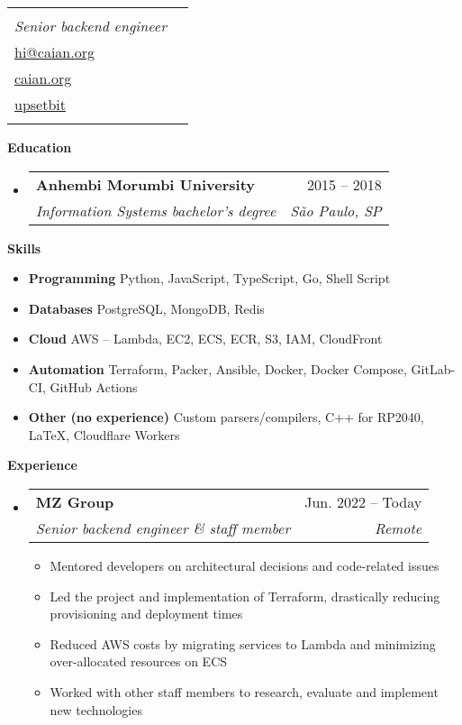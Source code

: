 \documentclass[letterpaper,12pt]{article}[leftmargin=*]
\makeatletter
\def \fullname {Caian Ertl}
\def \subtitle {Senior backend engineer}
\def \emailicon {\faEnvelope}
\def \emaillink {mailto:hi@caian.org}
\def \emailtext {hi@caian.org}
\def \phoneicon {\faPhone}
\def \phonetext {+1 (212) 555-4240}
\def \githubicon {\faGithub}
\def \githublink {https://github.com/upsetbit}
\def \githubtext {upsetbit}
\def \websiteicon {\faGlobe}
\def \websitelink {https://caian.org}
\def \websitetext {caian.org}
\def \headertype {\singlecol} %
\def \entryspacing {-0pt}
\def \phone {\phoneicon \hspace{3pt}{ \phonetext}}
\def \email {\emailicon \hspace{3pt}\href{\emaillink}{\emailtext}}
\def \github {\githubicon \hspace{3pt}\href{\githublink}{\githubtext}}
\def \website {\websiteicon \hspace{3pt}\href{\websitelink}{\websitetext}}
\renewcommand{\section}[2]{\vspace{5pt}
  \colorbox{secondary}{\color{white}\raggedbottom\normalsize\textbf{{#1}{\hspace{7pt}#2}}}
}
\newcommand{\resumeEntryStart}{\begin{itemize}[leftmargin=2.5mm]}
\newcommand{\resumeEntryEnd}{\end{itemize}\vspace{\entryspacing}}
\newcommand{\resumeItemListStart}{\begin{itemize}[leftmargin=4.5mm]}
\newcommand{\resumeItemListEnd}{\end{itemize}}
\newcommand{\resumeItem}[1]{
  \item\small{
    {#1 \vspace{-2pt}}
  }
}
\newcommand{\resumeEntryTSDL}[4]{
  \vspace{-1pt}\item[]
    \begin{tabularx}{0.97\textwidth}{X@{\hspace{60pt}}r}
      \textbf{\color{primary}#1} & {\firabook\color{accent}\small#2} \\
      \textit{\color{accent}\small#3} & \textit{\color{accent}\small#4} \\
    \end{tabularx}\vspace{-6pt}
}
\newcommand{\resumeEntryS}[2]{
  \item[]\small{
    \textbf{\color{primary}#1 }{ #2 \vspace{-6pt}}
  }
}
\newcommand{\doublecol}[5]{
  \begin{tabularx}{\textwidth}{Xr}
    {
      \begin{tabular}[c]{l}
        \fontsize{35}{45}\selectfont{\color{primary}{{\textbf{\fullname}}}} \\
        {\textit{\subtitle}} %
      \end{tabular}
    } & {
      \begin{tabular}[c]{l@{\hspace{1.5em}}l}
        {\small#3} & {\small#1} \\
        {\small#4} & {\small#2} \\
        {\small#5}
      \end{tabular}
    }
  \end{tabularx}
}
\newcommand{\singlecol}[5]{
  \begin{tabularx}{\textwidth}{Xr}
    {
      \begin{tabular}[b]{l}
        \fontsize{35}{45}\selectfont{\color{primary}{{\textbf{\fullname}}}} \\
        {\textit{\subtitle}} %
      \end{tabular}
    } & {
      \begin{tabular}[c]{l}
        {\small#1} \\
        {\small#2} \\
        {\small#3} \\
        {\small#4} \\
        {\small#5}
      \end{tabular}
    }
  \end{tabularx}
}
\makeatother
\begin{document}


\headertype{\phone}{\email}{\website}{\github}{} %
\vspace{-10pt} %

\section{\faGraduationCap}{Education }

  \resumeEntryStart
    \resumeEntryTSDL
      {Anhembi Morumbi University}{2015 -- 2018}
      {Information Systems bachelor’s degree}{São Paulo, SP}
  \resumeEntryEnd

\section{\faGears}{Skills }
 \resumeEntryStart
  \resumeEntryS{Programming } {Python, JavaScript, TypeScript, Go, Shell Script}
  \resumeEntryS{Databases } {PostgreSQL, MongoDB, Redis}
  \resumeEntryS{Cloud } {AWS -- Lambda, EC2, ECS, ECR, S3, IAM, CloudFront}
  \resumeEntryS{Automation } {Terraform, Packer, Ansible, Docker, Docker Compose, GitLab-CI, GitHub Actions}
  \resumeEntryS{Other (no experience) } {Custom parsers/compilers, C++ for RP2040, \LaTeX, Cloudflare Workers}
 \resumeEntryEnd

\section{\faPieChart}{Experience }

  \resumeEntryStart
    \resumeEntryTSDL
      {MZ Group}{Jun. 2022 -- Today}
      {Senior backend engineer \& staff member}{Remote}
    \resumeItemListStart
      \resumeItem {Mentored developers on architectural decisions and code-related issues}
      \resumeItem {Led the project and implementation of Terraform, drastically reducing provisioning and deployment times}
      \resumeItem {Reduced AWS costs by migrating services to Lambda and minimizing over-allocated resources on ECS}
      \resumeItem {Worked with other staff members to research, evaluate and implement new technologies}
    \resumeItemListEnd
  \resumeEntryEnd
\end{document}
